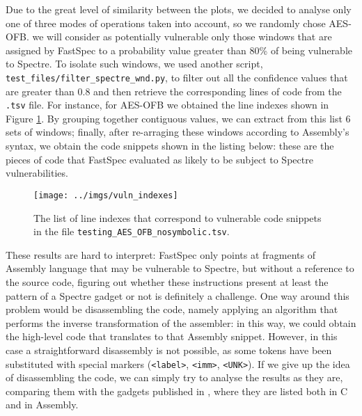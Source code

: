 \documentclass[12pt,a4paper]{book}
\theoremstyle{definition}
\begin{document}
	Due to the great level of similarity between the plots, we decided to analyse only one of three modes of operations taken into account, so we randomly chose AES-OFB. we will consider as potentially vulnerable only those windows that are assigned by FastSpec to a probability value greater than 80\% of being vulnerable to Spectre. To isolate such windows, we used another script, \texttt{test\_files/filter\_spectre\_wnd.py}, to filter out all the confidence values that are greater than 0.8 and then retrieve the corresponding lines of code from the \texttt{.tsv} file. For instance, for AES-OFB we obtained the line indexes shown in Figure \ref{fig:idx}. By grouping together contiguous values, we can extract from this list 6 sets of windows; finally, after re-arraging these windows according to Assembly's 
	syntax, we obtain the code snippets shown in the listing below: these are the pieces of code that FastSpec evaluated as likely to be subject to Spectre vulnerabilities.
	
	\begin{figure}
		\centering
		\texttt{[image: ../imgs/vuln\_indexes]}
		\caption{The list of line indexes that correspond to vulnerable code snippets in the file \texttt{testing\_AES\_OFB\_nosymbolic.tsv}.}
		\label{fig:idx}
	\end{figure}
	
	These results are hard to interpret: FastSpec only points at fragments of Assembly language that may be vulnerable to Spectre, but without a reference to the source code, figuring out whether these instructions present at least the pattern of a Spectre gadget or not is definitely a challenge. One way around this problem would be disassembling the code, namely applying an algorithm that performs the inverse transformation of the assembler: in this way, we could obtain the high-level code that translates to that Assembly snippet. However, in this case a straightforward disassembly is not possible, as some tokens have been substituted with special markers (\texttt{<label>}, \texttt{<imm>}, \texttt{<UNK>}). If we give up the idea of disassembling the code, we can simply try to analyse the results as they are, comparing them with the gadgets published in \cite{Kocher2018}, where they are listed both in C and in Assembly.
	
\end{document}
